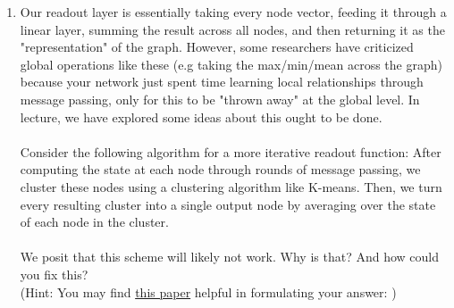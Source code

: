 \documentclass{article}
\begin{document}
\begin{enumerate}
\item Our readout layer is essentially taking every node vector, feeding it through a linear layer, summing the result across all nodes, and then returning it as the "representation" of the graph. However, some researchers have criticized global operations like these (e.g taking the max/min/mean across the graph) because your network just spent time learning local relationships through message passing, only for this to be "thrown away" at the global level. In lecture, we have explored some ideas about this ought to be done. \\\\
Consider the following algorithm for a more iterative readout function: After computing the state at each node through rounds of message passing, we cluster these nodes using a clustering algorithm like K-means. Then, we turn every resulting cluster into a single output node by averaging over the state of each node in the cluster. \\\\
We posit that this scheme will likely not work. Why is that? And how could you fix this?\\
(Hint: You may find \href{https://arxiv.org/pdf/1806.08804.pdf}{this paper} helpful in formulating your answer: )


\end{enumerate}
\end{document}
